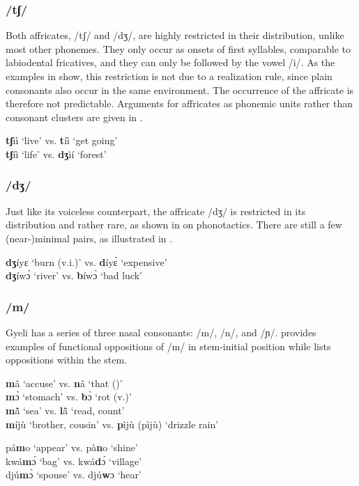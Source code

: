 \subsubsection*{\bfseries /tʃ/} Both affricates, /tʃ/ and /dʒ/, are highly restricted in their distribution, unlike most other phonemes. They only occur as onsets of first syllables, comparable to labiodental fricatives, and they can only be followed by the vowel /i/. As the examples in  show, this restriction is not due to a realization rule, since plain consonants also occur in the same environment. The occurrence of the affricate is therefore not predictable. Arguments for affricates as phonemic units rather than consonant clusters are given in .

\ea \label{ts}
{\bfseries tʃ}ìì `live' vs. {\bfseries t}íì `get going' \\
{\bfseries tʃ}íì `life' vs. {\bfseries dʒ}ìí `forest'
\z


\subsubsection*{\bfseries /dʒ/}   Just like its voiceless counterpart, the affricate /dʒ/ is restricted in its distribution and rather rare, as shown in  on phonotactics. There are still a few (near-)minimal pairs, as illustrated in .

\ea \label{dj}
{\bfseries dʒ}íyɛ `burn (v.i.)' vs. {\bfseries d}íyɛ̀ `expensive' \\
{\bfseries dʒ}íwɔ́ `river' vs. {\bfseries b}íwɔ̀ `bad luck' 
\z

\subsubsection*{\bfseries /m/} Gyeli has a series of three nasal consonants: /m/, /n/, and /ɲ/.  provides examples of functional oppositions of /m/ in stem-initial position while  lists oppositions within the stem.

\ea \label{m}
{\bfseries m}â `accuse' vs. {\bfseries n}â `that ({\COMP})' \\
{\bfseries m}ɔ̀ `stomach' vs. {\bfseries b}ɔ̀ `rot (v.)' \\
 {\bfseries m}ã̂ `sea' vs. {\bfseries l}ã̂ `read, count' \\
{\bfseries m}íjù `brother, cousin' vs. {\bfseries p}ìjù (pìjù) `drizzle rain'
\z

\ea \label{mm}
pá{\bfseries m}o `appear' vs. pà{\bfseries n}o `shine' \\
kwá{\bfseries m}ɔ́ `bag' vs. kwá{\bfseries d}ɔ́ `village' \\
djú{\bfseries m}ɔ̀ `spouse' vs. djú{\bfseries w}ɔ `hear' 
\z


